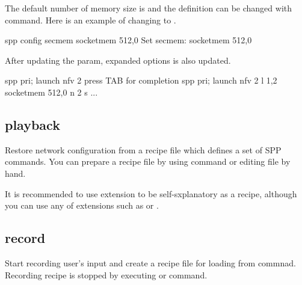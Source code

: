 \documentclass[a4paper,11pt,openany,oneside,english]{sphinxmanual}
\begin{document}
The default number of memory size is  and the definition
 can be changed with  command.
Here is an example of changing  to .

\begin{sphinxVerbatim}[commandchars=\\\{\},formatcom=\footnotesize]
spp \PYGZgt{} config sec\PYGZus{}mem \PYGZdq{}\PYGZhy{}\PYGZhy{}socket\PYGZhy{}mem 512,0\PYGZdq{}
Set sec\PYGZus{}mem: \PYGZdq{}\PYGZhy{}\PYGZhy{}socket\PYGZhy{}mem 512,0\PYGZdq{}
\end{sphinxVerbatim}

After updating the param, expanded options is also updated.

\begin{sphinxVerbatim}[commandchars=\\\{\},formatcom=\footnotesize]
spp \PYGZgt{} pri; launch nfv 2  \PYGZsh{} press TAB for completion
spp \PYGZgt{} pri; launch nfv 2 \PYGZhy{}l 1,2 \PYGZhy{}\PYGZhy{}socket\PYGZhy{}mem 512,0 \PYGZhy{}\PYGZhy{} \PYGZhy{}n 2 \PYGZhy{}s ...
\end{sphinxVerbatim}


\subsection{playback}
\label{\detokenize{commands/common:playback}}\label{\detokenize{commands/common:commands-common-playback}}
Restore network configuration from a recipe file which defines a set
of SPP commands.
You can prepare a recipe file by using  command or editing
file by hand.

It is recommended to use extension  to be self-sxplanatory as
a recipe, although you can use any of extensions such as  or
.

\begin{sphinxVerbatim}[commandchars=\\\{\},formatcom=\footnotesize]
\end{sphinxVerbatim}


\subsection{record}
\label{\detokenize{commands/common:record}}\label{\detokenize{commands/common:commands-common-record}}
Start recording user’s input and create a recipe file for loading
from  commnad.
Recording recipe is stopped by executing  or 
command.
\end{document}
